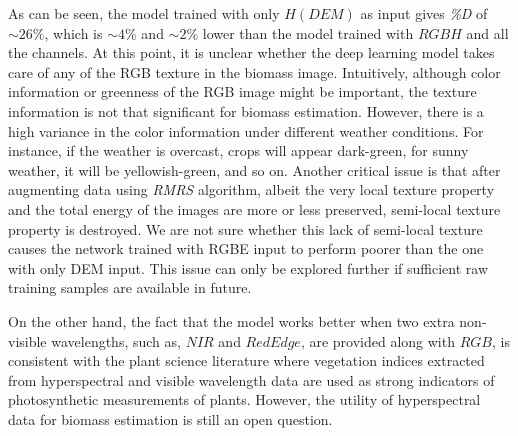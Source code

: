 \documentclass[10pt,twocolumn,letterpaper]{article}
\begin{document}
As can be seen, the model trained with only $H(DEM)$ as input gives \textit{\%D} of $\sim26\%$, which is $\sim4\%$ and $\sim2\%$ lower than the model trained with $RGBH$ and all the channels. At this point, it is unclear whether the deep learning model takes care of any of the RGB texture in the biomass image. Intuitively, although color information or greenness of the RGB image might be important, the texture information is not that significant for biomass estimation. However, there is a high variance in the color information under different weather conditions. For instance, if the weather is overcast, crops will appear dark-green, for sunny weather, it will be yellowish-green, and so on. Another critical issue is that after augmenting data using \textit{RMRS} algorithm, albeit the very local texture property and the total energy of the images are more or less preserved, semi-local texture property is destroyed. We are not sure whether this lack of semi-local texture causes the network trained with RGBE input to perform poorer than the one with only DEM input. This issue can only be explored further if sufficient raw training samples are available in future.

On the other hand, the fact that the model works better when two extra non-visible wavelengths, such as, $NIR$ and $Red Edge$, are provided along with $RGB$, is consistent with the plant science literature \cite{sellers1985} where vegetation indices extracted from hyperspectral and visible wavelength data are used as strong indicators of photosynthetic measurements of plants. However, the utility of hyperspectral data for biomass estimation is still an open question.

\end{document}
